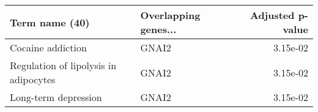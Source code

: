 \begin{tabular}{llr}
\toprule
                       Term name (40) & Overlapping genes... &  Adjusted p-value \\
\midrule
                    Cocaine addiction &                GNAI2 &          3.15e-02 \\
Regulation of lipolysis in adipocytes &                GNAI2 &          3.15e-02 \\
                 Long-term depression &                GNAI2 &          3.15e-02 \\
\bottomrule
\end{tabular}
